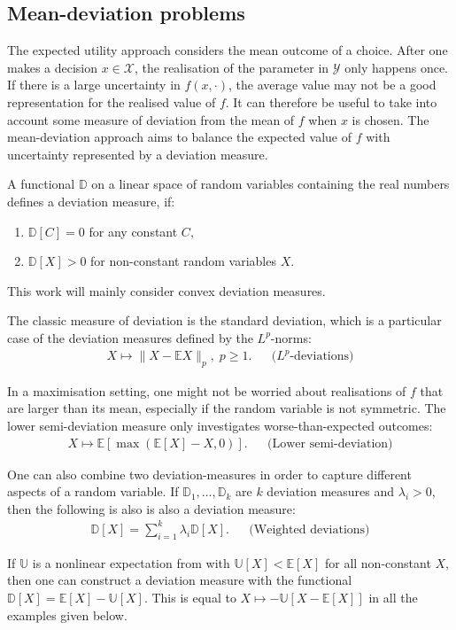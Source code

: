 \documentclass[main.tex]{subfiles}
\begin{document}
\subsection{Mean-deviation problems}
The expected utility approach considers the mean outcome of a choice.
After one makes a decision $x\in\mathcal{X}$, the realisation of the
parameter in $\mathcal{Y}$ only happens once. If there is a large
uncertainty in $f(x,\cdot)$, the average value may not be a good
representation for the realised value of $f$.
It can therefore be useful to take into account some measure of
deviation from the mean of $f$ when $x$ is chosen.
The mean-deviation approach aims to balance the expected value of $f$
with uncertainty represented by a deviation measure.
\begin{mydef}
  A functional $\mathbb D$ on a linear space of random
  variables containing the real numbers defines a deviation measure, if:
  \begin{enumerate}
  \item $\mathbb D[C] = 0$ for any constant $C$,
  \item $\mathbb D[X]>0$ for non-constant random variables $X$.
  \end{enumerate}
  This work will mainly consider convex deviation measures.
\end{mydef}

\begin{example}
  The classic measure of deviation is the standard deviation, which is
  a particular case of the deviation measures defined by
  the $L^p$-norms:
  \begin{align}
    X\mapsto \|X-\mathbb EX\|_p,\; p\geq 1.
    && \text{($L^p$-deviations)}
  \end{align}

  In a maximisation setting, one might not be worried about
  realisations of $f$ that are larger than its mean, especially if the
  random variable is not symmetric.
  The lower semi-deviation measure only investigates
  worse-than-expected outcomes:
  \begin{align}
    X\mapsto \mathbb E[\max(\mathbb E[X]-X,0)].
    &&\text{(Lower semi-deviation)}
  \end{align}

  One can also combine two deviation-measures in order to capture
  different aspects of a random variable.
  If $\mathbb D_1,\dots,\mathbb D_k$ are $k$ deviation measures and
  $\lambda_i>0$, then the following is also
  is also a deviation measure:
  \begin{align}
    \mathbb D[X]=\sum_{i=1}^k\lambda_i\mathbb D[X].
    &&\text{(Weighted deviations)}
  \end{align}

  If $\mathbb U$ is a nonlinear expectation from
   with $\mathbb U[X]< \mathbb
  E[X]$ for all non-constant $X$,
  then one can
  construct a deviation measure with the functional
  $\mathbb D[X]=\mathbb E[X]-\mathbb U[X]$.
  This is equal to $X\mapsto -\mathbb U[X-\mathbb E[X]]$ in all the
  examples given below.
\end{example}
\end{document}
